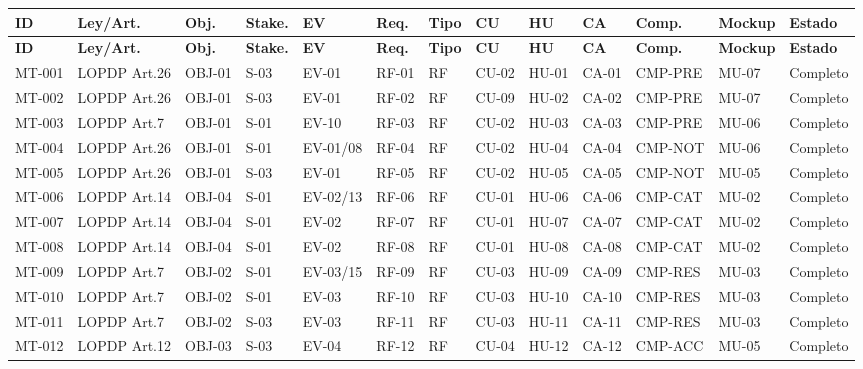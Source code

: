 \documentclass[12pt,journal,onecolumn]{IEEEtran}
\begin{document}
\begin{landscape}
\tiny
\begin{longtable}{P{0.9cm}P{1.5cm}P{0.8cm}P{0.8cm}P{1.3cm}P{0.9cm}P{0.7cm}P{0.8cm}P{0.8cm}P{0.8cm}P{1.1cm}P{0.9cm}P{1.0cm}}
\toprule
\textbf{ID} & \textbf{Ley/Art.} & \textbf{Obj.} & \textbf{Stake.} & \textbf{EV} & \textbf{Req.} & \textbf{Tipo} & \textbf{CU} & \textbf{HU} & \textbf{CA} & \textbf{Comp.} & \textbf{Mockup} & \textbf{Estado}\\\midrule\endfirsthead
\toprule
\textbf{ID} & \textbf{Ley/Art.} & \textbf{Obj.} & \textbf{Stake.} & \textbf{EV} & \textbf{Req.} & \textbf{Tipo} & \textbf{CU} & \textbf{HU} & \textbf{CA} & \textbf{Comp.} & \textbf{Mockup} & \textbf{Estado}\\\midrule\endhead
MT-001 & LOPDP Art.26 & OBJ-01 & S-03 & EV-01 & RF-01 & RF & CU-02 & HU-01 & CA-01 & CMP-PRE & MU-07 & Completo\\
MT-002 & LOPDP Art.26 & OBJ-01 & S-03 & EV-01 & RF-02 & RF & CU-09 & HU-02 & CA-02 & CMP-PRE & MU-07 & Completo\\
MT-003 & LOPDP Art.7 & OBJ-01 & S-01 & EV-10 & RF-03 & RF & CU-02 & HU-03 & CA-03 & CMP-PRE & MU-06 & Completo\\
MT-004 & LOPDP Art.26 & OBJ-01 & S-01 & EV-01/08 & RF-04 & RF & CU-02 & HU-04 & CA-04 & CMP-NOT & MU-06 & Completo\\
MT-005 & LOPDP Art.26 & OBJ-01 & S-03 & EV-01 & RF-05 & RF & CU-02 & HU-05 & CA-05 & CMP-NOT & MU-05 & Completo\\
MT-006 & LOPDP Art.14 & OBJ-04 & S-01 & EV-02/13 & RF-06 & RF & CU-01 & HU-06 & CA-06 & CMP-CAT & MU-02 & Completo\\
MT-007 & LOPDP Art.14 & OBJ-04 & S-01 & EV-02 & RF-07 & RF & CU-01 & HU-07 & CA-07 & CMP-CAT & MU-02 & Completo\\
MT-008 & LOPDP Art.14 & OBJ-04 & S-01 & EV-02 & RF-08 & RF & CU-01 & HU-08 & CA-08 & CMP-CAT & MU-02 & Completo\\
MT-009 & LOPDP Art.7 & OBJ-02 & S-01 & EV-03/15 & RF-09 & RF & CU-03 & HU-09 & CA-09 & CMP-RES & MU-03 & Completo\\
MT-010 & LOPDP Art.7 & OBJ-02 & S-01 & EV-03 & RF-10 & RF & CU-03 & HU-10 & CA-10 & CMP-RES & MU-03 & Completo\\
MT-011 & LOPDP Art.7 & OBJ-02 & S-03 & EV-03 & RF-11 & RF & CU-03 & HU-11 & CA-11 & CMP-RES & MU-03 & Completo\\
MT-012 & LOPDP Art.12 & OBJ-03 & S-03 & EV-04 & RF-12 & RF & CU-04 & HU-12 & CA-12 & CMP-ACC & MU-05 & Completo\\

\end{longtable}
\end{landscape}
\end{document}
